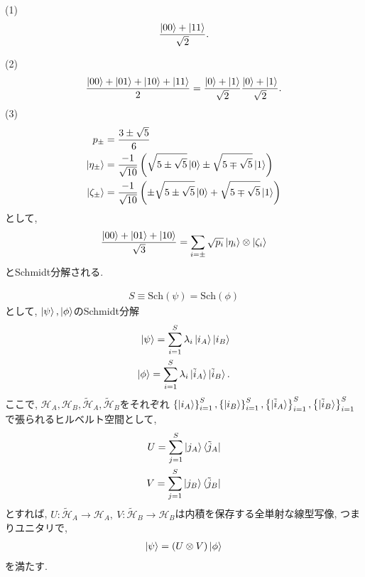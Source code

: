 \begin{ex}
    \label{ex2.79}
    (1)\
    \begin{align*}
        \frac{\ket{00} + \ket{11}}{\sqrt{2}}.
    \end{align*}
    \par
    (2)\
    \begin{align*}
        \frac{\ket{00}+\ket{01}+\ket{10}+\ket{11}}{2} = \frac{\ket{0} + \ket{1}}{\sqrt{2}} \frac{\ket{0} + \ket{1}}{\sqrt{2}} .
    \end{align*}
    (3)\
    \begin{align*}
        p_{\pm} &= \frac{3 \pm \sqrt{5}}{6} \\
        \ket{\eta_\pm} &= \frac{-1}{\sqrt{10}} 
        \left( 
            \sqrt{5 \pm \sqrt{5} } \ket{0}
            \pm
            \sqrt{5 \mp \sqrt{5} } \ket{1}
        \right) \\
        \ket{\zeta_\pm} &= \frac{-1}{\sqrt{10}} 
        \left( 
            \pm \sqrt{5 \pm \sqrt{5} } \ket{0}
            +
            \sqrt{5 \mp \sqrt{5} } \ket{1}
        \right)
    \end{align*}
    として, 
    \begin{align*}
        \frac{\ket{00}+\ket{01} + \ket{10}}{\sqrt{3}} =
        \sum_{i = \pm} \sqrt{p_i} \ket{\eta_i} \otimes \ket{\zeta_i}
    \end{align*}
    とSchmidt分解される.
\end{ex}

\begin{ex}
    \label{ex2.80}
    \begin{align*}
        S \equiv \mathrm{Sch}(\psi) = \mathrm{Sch}(\phi)
    \end{align*}
    として, $\ket{\psi}, \ket{\phi}$のSchmidt分解
    \begin{align*}
        \ket{\psi} = \sum_{i=1}^{S} \lambda_i \ket{i_A}\ket{i_B}                  \\
        \ket{\phi} = \sum_{i=1}^{S} {\lambda}_i \ket{\tilde{i}_A} \ket{\tilde{i}_B}.
    \end{align*}
    ここで, $\mathcal{H}_A, \mathcal{H}_B, \tilde{\mathcal{H}}_A, \tilde{\mathcal{H}}_B$をそれぞれ
    $\left\{ \ket{i_A}\right\}_{i = 1}^S, \left\{ \ket{i_B}\right\}_{i = 1}^S,
    \left\{ \ket{\tilde{i}_A}\right\}_{i = 1}^S, \left\{ \ket{\tilde{i}_B}\right\}_{i = 1}^S$で張られるヒルベルト空間として, 
    \begin{align*}
        U = \sum_{j=1}^S \ket{j_A} \bra{\tilde{j}_A} \\
        V= \sum_{j=1}^S \ket{j_B} \bra{\tilde{j}_B}
    \end{align*}
    とすれば, $U : \tilde{\mathcal{H}}_A \to \mathcal{H}_A , \ V : \tilde{\mathcal{H}}_B \to \mathcal{H}_B $は内積を保存する全単射な線型写像, つまりユニタリで,
    \begin{align*}
        \ket{\psi} = (U \otimes V)\ket{\phi}
    \end{align*}
    を満たす.
\end{ex}


